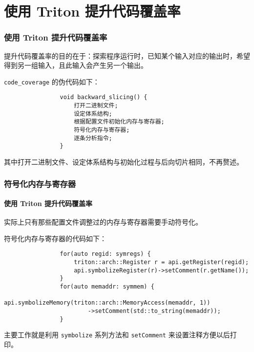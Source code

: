 \documentclass{ctexbeamer}
\begin{document}
    \section{使用 Triton 提升代码覆盖率}
    \begin{frame}[fragile]
        \frametitle{使用 Triton 提升代码覆盖率}

        提升代码覆盖率的目的在于：探索程序运行时，已知某个输入对应的输出时，希望得到另一组输入，且此输入会产生另一个输出。
    
        \texttt{code_coverage} 的伪代码如下：
    
        {
            \small
            \begin{verbatim}
                void backward_slicing() {
                    打开二进制文件;
                    设定体系结构;
                    根据配置文件初始化内存与寄存器;
                    符号化内存与寄存器;
                    逐条分析指令;
                }
            \end{verbatim}
        }

        其中打开二进制文件、设定体系结构与初始化过程与后向切片相同，不再赘述。
    \end{frame}

    \begin{frame}[fragile]
        \frametitle{符号化内存与寄存器}
        \framesubtitle{使用 Triton 提升代码覆盖率}

        实际上只有那些配置文件调整过的内存与寄存器需要手动符号化。
    
        符号化内存与寄存器的代码如下：

        {
            \small
            \begin{verbatim}
                for(auto regid: symregs) {
                    triton::arch::Register r = api.getRegister(regid);
                    api.symbolizeRegister(r)->setComment(r.getName());
                }
                for(auto memaddr: symmem) {
                    api.symbolizeMemory(triton::arch::MemoryAccess(memaddr, 1))
                        ->setComment(std::to_string(memaddr));
                }
            \end{verbatim}
        }\pause

        主要工作就是利用 \texttt{symbolize} 系列方法和 \texttt{setComment} 来设置注释方便以后打印。
    
    \end{frame}
\end{document}
